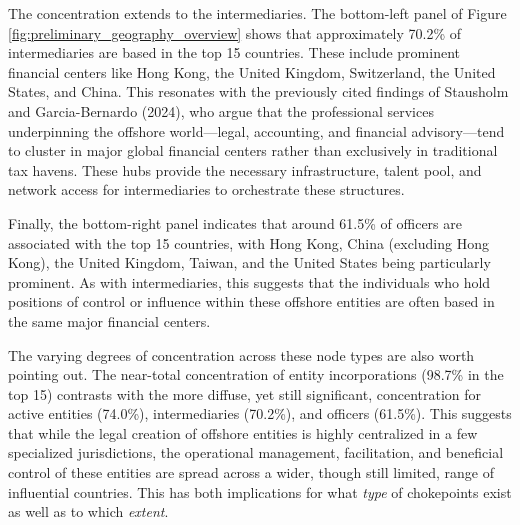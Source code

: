 The concentration extends to the intermediaries. The bottom-left panel of Figure \ref{fig:preliminary_geography_overview} shows that approximately 70.2\% of intermediaries are based in the top 15 countries. These include prominent financial centers like Hong Kong, the United Kingdom, Switzerland, the United States, and China. This resonates with the previously cited findings of Stausholm and Garcia-Bernardo (2024), who argue that the professional services underpinning the offshore world—legal, accounting, and financial advisory—tend to cluster in major global financial centers rather than exclusively in traditional tax havens. These hubs provide the necessary infrastructure, talent pool, and network access for intermediaries to orchestrate these structures.

Finally, the bottom-right panel indicates that around 61.5\% of officers are associated with the top 15 countries, with Hong Kong, China (excluding Hong Kong), the United Kingdom, Taiwan, and the United States being particularly prominent. As with intermediaries, this suggests that the individuals who hold positions of control or influence within these offshore entities are often based in the same major financial centers.

The varying degrees of concentration across these node types are also worth pointing out. The near-total concentration of entity incorporations (98.7\% in the top 15) contrasts with the more diffuse, yet still significant, concentration for active entities (74.0\%), intermediaries (70.2\%), and officers (61.5\%). This suggests that while the legal creation of offshore entities is highly centralized in a few specialized jurisdictions, the operational management, facilitation, and beneficial control of these entities are spread across a wider, though still limited, range of influential countries. This has both implications for what \textit{type} of chokepoints exist as well as to which \textit{extent}.

